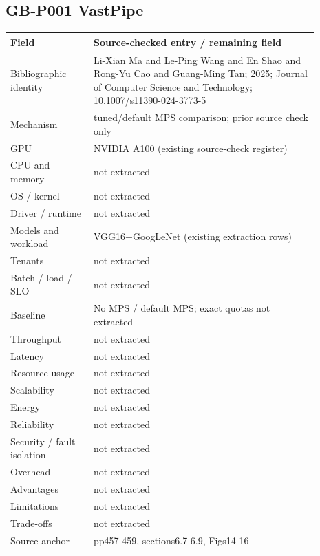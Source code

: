 \documentclass[12pt,a4paper]{article}
\begin{document}
\subsection{GB-P001 VastPipe}
\begin{longtable}{p{0.24\linewidth}p{0.65\linewidth}}
\toprule
Field & Source-checked entry /\allowbreak{} remaining field\\\midrule
\endhead
Bibliographic identity & Li-Xian Ma and Le-Ping Wang and En Shao and Rong-Yu Cao and Guang-Ming Tan; 2025; Journal of Computer Science and Technology; 10.1007/\allowbreak{}s11390-024-3773-5\\
Mechanism & tuned/\allowbreak{}default MPS comparison; prior source check only\\
GPU & NVIDIA A100 (existing source-check register)\\
CPU and memory & not extracted\\
OS /\allowbreak{} kernel & not extracted\\
Driver /\allowbreak{} runtime & not extracted\\
Models and workload & VGG16+GoogLeNet (existing extraction rows)\\
Tenants & not extracted\\
Batch /\allowbreak{} load /\allowbreak{} SLO & not extracted\\
Baseline & No MPS /\allowbreak{} default MPS; exact quotas not extracted\\
Throughput & not extracted\\
Latency & not extracted\\
Resource usage & not extracted\\
Scalability & not extracted\\
Energy & not extracted\\
Reliability & not extracted\\
Security /\allowbreak{} fault isolation & not extracted\\
Overhead & not extracted\\
Advantages & not extracted\\
Limitations & not extracted\\
Trade-offs & not extracted\\
Source anchor & pp457-459, sections6.7-6.9, Figs14-16\\
\bottomrule
\end{longtable}
\end{document}

